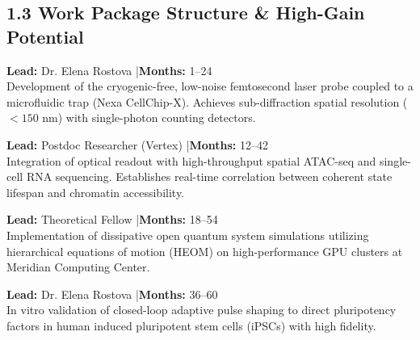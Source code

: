 \documentclass[11pt,a4paper]{article}
\begin{document}
\subsection*{1.3 Work Package Structure \& High-Gain Potential}

\noindent
\begin{minipage}[t]{0.48\textwidth}
  \begin{tcolorbox}[wpbox, title={\color{ErcTeal}\faTasks\ Work Package 1: Spectroscopic Instrumentation}]
    \textbf{Lead:} Dr. Elena Rostova \quad |\quad \textbf{Months:} 1--24 \\[4pt]
    \small
    Development of the cryogenic-free, low-noise femtosecond laser probe coupled to a microfluidic trap (Nexa CellChip-X). Achieves sub-diffraction spatial resolution ($<150\text{ nm}$) with single-photon counting detectors.
  \end{tcolorbox}
\end{minipage}%
\hfill
\begin{minipage}[t]{0.48\textwidth}
  \begin{tcolorbox}[wpbox, title={\color{ErcTeal}\faDna\ Work Package 2: Single-Cell Spatial Genomics}]
    \textbf{Lead:} Postdoc Researcher (Vertex) \quad |\quad \textbf{Months:} 12--42 \\[4pt]
    \small
    Integration of optical readout with high-throughput spatial ATAC-seq and single-cell RNA sequencing. Establishes real-time correlation between coherent state lifespan and chromatin accessibility.
  \end{tcolorbox}
\end{minipage}

\par\vspace{8pt}

\noindent
\begin{minipage}[t]{0.48\textwidth}
  \begin{tcolorbox}[wpbox, title={\color{ErcTeal}\faCalculator\ Work Package 3: Theoretical Modeling Framework}]
    \textbf{Lead:} Theoretical Fellow \quad |\quad \textbf{Months:} 18--54 \\[4pt]
    \small
    Implementation of dissipative open quantum system simulations utilizing hierarchical equations of motion (HEOM) on high-performance GPU clusters at Meridian Computing Center.
  \end{tcolorbox}
\end{minipage}%
\hfill
\begin{minipage}[t]{0.48\textwidth}
  \begin{tcolorbox}[wpbox, title={\color{ErcTeal}\faLightbulb\ Work Package 4: Coherent Optogenetic Reprogramming}]
    \textbf{Lead:} Dr. Elena Rostova \quad |\quad \textbf{Months:} 36--60 \\[4pt]
    \small
    In vitro validation of closed-loop adaptive pulse shaping to direct pluripotency factors in human induced pluripotent stem cells (iPSCs) with high fidelity.
  \end{tcolorbox}
\end{minipage}
\end{document}

